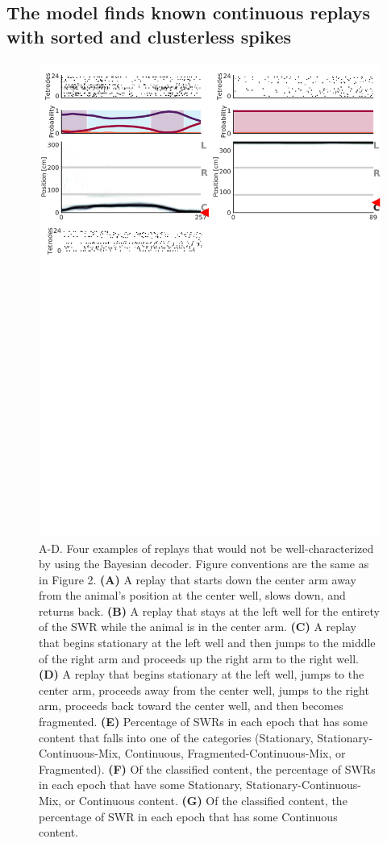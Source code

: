 \documentclass[times, twoside]{zHenriquesLab-StyleBioRxiv}
\begin{document}
\subsection*{The model finds known continuous replays with sorted and clusterless spikes}

\begin{figure}%
\centering
\includegraphics[width=0.80\linewidth]{figures/Figure3/Figure3_v4}
\caption{A-D. Four examples of replays that would not be well-characterized by using the Bayesian decoder. Figure conventions are the same as in Figure 2. \textbf{(A)} A replay that starts down the center arm away from the animal's position at the center well, slows down, and returns back. \textbf{(B)} A replay that stays at the left well for the entirety of the SWR while the animal is in the center arm. \textbf{(C)} A replay that begins stationary at the left well and then jumps to the middle of the right arm and proceeds up the right arm to the right well. \textbf{(D)} A replay that begins stationary at the left well, jumps to the center arm, proceeds away from the center well, jumps to the right arm, proceeds back toward the center well, and then becomes fragmented. \textbf{(E)} Percentage of SWRs in each epoch that has some content that falls into one of the categories (Stationary, Stationary-Continuous-Mix, Continuous, Fragmented-Continuous-Mix, or Fragmented). \textbf{(F)} Of the classified content, the percentage of SWRs in each epoch that have some Stationary, Stationary-Continuous-Mix, or Continuous content. \textbf{(G)} Of the classified content, the percentage of SWR in each epoch that has some Continuous content.
}
\label{3}
\end{figure}
\end{document}
